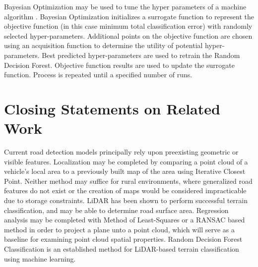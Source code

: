 \documentclass[numbered,pdftex]{ohio-etd}
\begin{document}
{{		{Bayesian Optimization may be used to tune the hyper parameters of a machine algorithm \cite{noauthor_bayesian_nodate, snoek_practical_2012}. Bayesian Optimization initializes a surrogate function to represent the objective function (in this case minimum total classification error) with randomly selected hyper-parameters. Additional points on the objective function are chosen using an acquisition function to determine the utility of potential hyper-parameters. Best predicted hyper-parameters are used to retrain the Random Decision Forest. Objective function results are used to update the surrogate function. Process is repeated until a specified number of runs.}
		
	} %
	
	\section{Closing Statements on Related Work}{
		
		{Current road detection models principally rely upon preexisting geometric or visible features. Localization may be completed by comparing a point cloud of a vehicle's local area to a previously built map of the area using Iterative Closest Point. Neither method may suffice for rural environments, where generalized road features do not exist or the creation of maps would be considered impracticable due to storage constraints. LiDAR has been shown to perform successful terrain classification, and may be able to determine road surface area. Regression analysis may be completed with Method of Least-Squares or a RANSAC based method in order to project a plane unto a point cloud, which will serve as a baseline for examining point cloud spatial properties. Random Decision Forest Classification is an established method for LiDAR-based terrain classification using machine learning.}
		
	} %
	
} %
\end{document}
